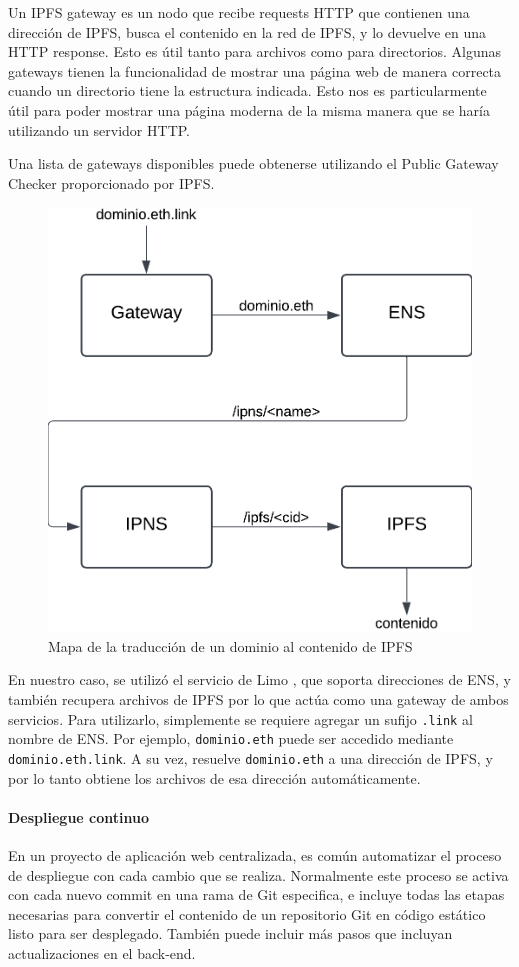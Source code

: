 Un IPFS gateway es un nodo que recibe requests HTTP que contienen una dirección de IPFS, busca el contenido en la red de IPFS, y lo devuelve en una HTTP response. Esto es útil tanto para archivos como para directorios. Algunas gateways tienen la funcionalidad de mostrar una página web de manera correcta cuando un directorio tiene la estructura indicada. Esto nos es particularmente útil para poder mostrar una página moderna de la misma manera que se haría utilizando un servidor HTTP.

Una lista de gateways disponibles puede obtenerse utilizando el Public Gateway Checker \cite{public-gateway-checker} proporcionado por IPFS.

\begin{figure}[h!]
    \centering
    \includegraphics[width=0.5\linewidth]{img/solucion-ipfs/traduccion-dominio.png}
    \caption{Mapa de la traducción de un dominio al contenido de IPFS}
    \label{fig:traduccion-ipfs}
\end{figure}

En nuestro caso, se utilizó el servicio de Limo \cite{limo}, que soporta direcciones de ENS, y también recupera archivos de IPFS por lo que actúa como una gateway de ambos servicios. Para utilizarlo, simplemente se requiere agregar un sufijo \texttt{.link} al nombre de ENS. Por ejemplo, \texttt{dominio.eth} puede ser accedido mediante \texttt{dominio.eth.link}. A su vez, resuelve \texttt{dominio.eth} a una dirección de IPFS, y por lo tanto obtiene los archivos de esa dirección automáticamente.

\paragraph{Despliegue continuo}

En un proyecto de aplicación web centralizada, es común automatizar el proceso de despliegue con cada cambio que se realiza. Normalmente este proceso se activa con cada nuevo commit en una rama de Git especifica, e incluye todas las etapas necesarias para convertir el contenido de un repositorio Git en código estático listo para ser desplegado. También puede incluir más pasos que incluyan actualizaciones en el back-end.

